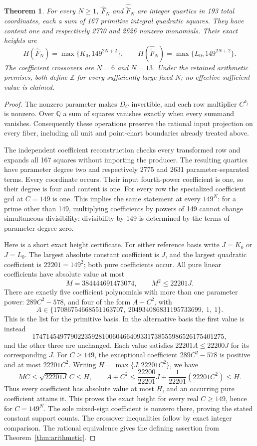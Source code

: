 \documentclass[11pt,a4paper]{article}
\newtheorem{theorem}[proposition]{Theorem}
\begin{document}
\begin{theorem}\label{thm:compact193}
For every $N\ge1$, $\widehat F_N$ and $\widehat{\widetilde F}_N$
are integer quartics in 193 total coordinates, each a sum of 167
primitive integral quadratic squares. They have content one and
respectively 2770 and 2626 nonzero monomials. Their exact heights are
\[
 H(\widehat F_N)=\max\{K_0,149^{2N+2}\},\qquad
 H(\widehat{\widetilde F}_N)=\max\{L_0,149^{2N+2}\}.
\]
The coefficient crossovers are $N=6$ and $N=13$. Under the retained
arithmetic premises, both define $\mathbb Z$ for every sufficiently
large fixed $N$; no effective sufficient value is claimed.
\end{theorem}
\begin{proof}
The nonzero parameter makes $D_C$ invertible, and each row multiplier
$C^{k_j}$ is nonzero. Over $\mathbb Q$ a sum of squares vanishes
exactly when every summand vanishes. Consequently these operations
preserve the rational input projection on every fiber, including all
unit and point-chart boundaries already treated above.

The independent coefficient reconstruction checks every transformed
row and expands all 167 squares without importing the producer. The
resulting quartics have parameter degree two and respectively 2775
and 2631 parameter-separated terms. Every coordinate occurs. Their
input fourth-power coefficient is one, so their degree is four and
content is one. For every row the specialized coefficient gcd at
$C=149$ is one. This implies the same statement at every $149^N$:
for a prime other than 149, multiplying coefficients by powers of
149 cannot change simultaneous divisibility; divisibility by 149
is determined by the terms of parameter degree zero.

Here is a short exact height certificate. For either reference basis
write $J=K_0$ or $J=L_0$. The largest absolute constant coefficient
is $J$, and the largest quadratic coefficient is $22201=149^2$;
both pure coefficients occur. All pure linear coefficients have
absolute value at most
\[
 M=384444691473074,\qquad M^2\le22201J.
\]
There are exactly five coefficient polynomials with more than one
parameter power: $289C^2-578$, and four of the form $A+C^2$, with
\[
 A\in\{17086754668551163707,\ 204934086831195733699,\ 1,\ 1\}.
\]
This is the list for the primitive basis. In the alternative basis
the first value is instead
\[
 1747145497790223592810060466409331738555986526175401275,
\]
and the other three are unchanged. Each value satisfies
$22201A\le22200J$ for its corresponding $J$. For $C\ge149$, the exceptional
coefficient $289C^2-578$ is positive and at most $22201C^2$.
Writing $H=\max\{J,22201C^2\}$, we have
\[
 MC\le\sqrt{22201J}\,C\le H,
 \qquad
 A+C^2\le\frac{22200}{22201}J+
             \frac1{22201}(22201C^2)\le H.
\]
Thus every coefficient has absolute value at most $H$, and an
occurring pure coefficient attains it. This proves the exact height
for every real $C\ge149$, hence for $C=149^N$. The sole mixed-sign
coefficient is nonzero there, proving the stated constant support
counts. The crossover inequalities follow by exact integer comparison.
The rational equivalence gives the defining assertion from
Theorem~\ref{thm:arithmetic}.
\end{proof}
\end{document}
